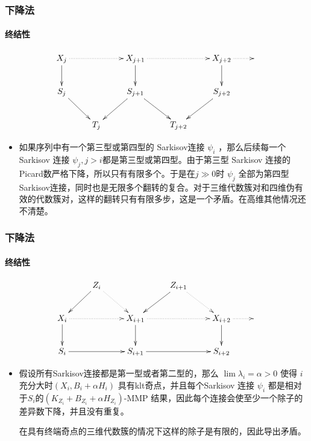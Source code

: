 \documentclass[10pt]{ctexbeamer}
\begin{document}
\begin{frame}[shrink]
  \frametitle{下降法}
  \framesubtitle{终结性}
\[ \xymatrix{
    X_{j}\ar@{.>}[rr]\ar[d] &       & X_{j+1}\ar[d]\ar@{.>}[rr] &         & X_{j+2}\ar[d]\ar@{.>}[r] & \\
    S_{j}\ar[rd]            &       & S_{j+1}\ar[ld]\ar[rd]     &         & S_{j+2}\ar[ld]\\
                            & T_{j} &                           & T_{j+2} &
  } \]
 \begin{itemize}
  \item 如果序列中有一个第三型或第四型的 Sarkisov连接 $\psi_i$ ，那么后续每一个 Sarkisov 连接 $\psi_j, j>i$都是第三型或第四型。由于第三型 Sarkisov 连接的 Picard数严格下降，所以只有有限多个。于是在$j\gg 0$时 $\psi_j$ 全部为第四型Sarkisov连接，同时也是无限多个翻转的复合。对于三维代数簇对和四维伪有效的代数簇对，这样的翻转只有有限多步，这是一个矛盾。在高维其他情况还不清楚。
 \end{itemize} 
\end{frame}

\begin{frame}[shrink]
  \frametitle{下降法}
  \framesubtitle{终结性}
\[ \xymatrix{
    &Z_{i}\ar[ld]\ar@{.>}[rd]&&Z_{i+1}\ar[ld]\ar@{.>}[rd]\\
    X_{i}\ar@{.>}[rr]\ar[d] &       & X_{i+1}\ar[d]\ar@{.>}[rr] &         & X_{i+2}\ar[d]\ar@{.>}[r] & \\
    S_{i}\ar[rr]            &       & S_{i+1}\ar[rr]     &         & S_{i+2}\\
  } \]
 \begin{itemize}
   \item 假设所有Sarkisov连接都是第一型或者第二型的，那么 $\lim \lambda_{i}=\alpha > 0$ 使得 $i$ 充分大时$(X_i,B_i+\alpha H_i)$ 具有klt奇点，并且每个Sarkisov 连接 $\psi_i$ 都是相对于$S_{i}$的$(K_{Z_i}+B_{Z_i}+\alpha H_{Z_i})$-MMP 结果，因此每个连接会使至少一个除子的差异数下降，并且没有重复。

     在具有终端奇点的三维代数簇的情况下这样的除子是有限的，因此导出矛盾。
 \end{itemize} 
\end{frame}
\end{document}
